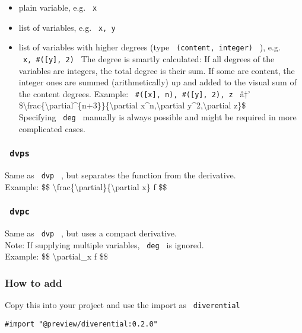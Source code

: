 \begin{itemize}
\tightlist
\item
  plain variable, e.g. \texttt{\ x\ }
\item
  list of variables, e.g. \texttt{\ x,\ y\ }
\item
  list of variables with higher degrees (type
  \texttt{\ (content,\ integer)\ } ), e.g.
  \texttt{\ x,\ \#({[}y{]},\ 2)\ } The degree is smartly calculated: If
  all degrees of the variables are integers, the total degree is their
  sum. If some are content, the integer ones are summed (arithmetically)
  up and added to the visual sum of the content degrees. Example:
  \texttt{\ \#({[}x{]},\ n),\ \#({[}y{]},\ 2),\ z\ } â†'
  \$\textbackslash frac\{\textbackslash partial\^{}\{n+3\}\}\{\textbackslash partial
  x\^{}n,\textbackslash partial y\^{}2,\textbackslash partial z\}\$\\
  Specifying \texttt{\ deg\ } manually is always possible and might be
  required in more complicated cases.
\end{itemize}

\subsubsection{\texorpdfstring{\texttt{\ dvps\ }}{ dvps }}\label{dvps}

Same as \texttt{\ dvp\ } , but separates the function from the
derivative.\\
Example: \$\$
\textbackslash frac\{\textbackslash partial\}\{\textbackslash partial
x\} f \$\$

\subsubsection{\texorpdfstring{\texttt{\ dvpc\ }}{ dvpc }}\label{dvpc}

Same as \texttt{\ dvp\ } , but uses a compact derivative.\\
Note: If supplying multiple variables, \texttt{\ deg\ } is ignored.\\
Example: \$\$ \textbackslash partial\_x f \$\$

\subsubsection{How to add}\label{how-to-add}

Copy this into your project and use the import as
\texttt{\ diverential\ }

\begin{verbatim}
#import "@preview/diverential:0.2.0"
\end{verbatim}

